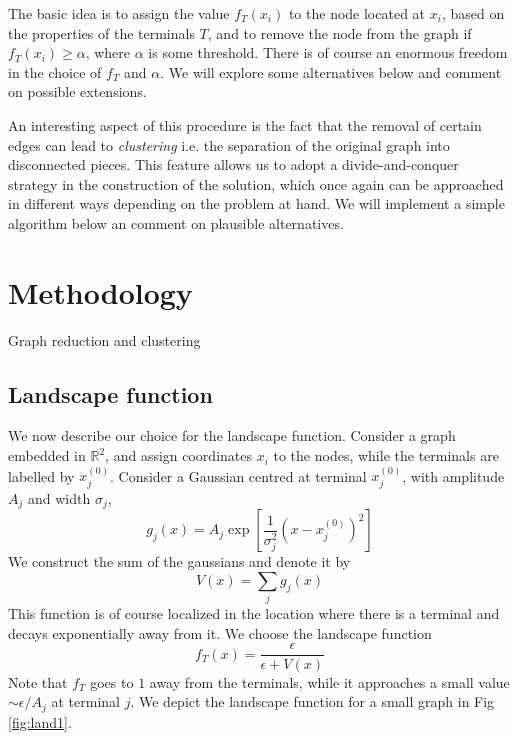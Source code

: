 \documentclass[12pt]{article}
\begin{document}
The basic idea is to assign the value $f_T(x_i)$ to the node located at $x_i$, based on the properties of the terminals $T$, 
and to remove the node from the graph if $f_T(x_i) \geq \alpha$, where $\alpha$ is some threshold.  
%
There is of course an enormous freedom in the choice of  $f_T$ and $\alpha$. We will explore some alternatives below and comment on possible extensions. 

An interesting aspect of this procedure is the fact that the removal of certain edges can lead to {\it clustering} i.e. the separation of the original graph into disconnected pieces. 
%
This feature allows us to adopt a divide-and-conquer strategy in the construction of the solution, which once again can be approached in different ways depending on the problem at hand. We will implement a simple algorithm below an comment on plausible alternatives. 


\section{Methodology}

Graph reduction and clustering

\subsection{Landscape function}

We now describe our choice for the landscape function. Consider a graph embedded in $\mathbb{R}^2$, and assign coordinates $x_i$ to the nodes, while the terminals are labelled by $x^{(0)}_j$. Consider a Gaussian centred at terminal $x^{(0)}_j$, with amplitude $A_j$ and width 
$\sigma_j$, 
%
\begin{equation}
	g_j(x) = A_j \exp\left[ \frac{1}{\sigma_j^2}(x -  x^{(0)}_j)^2 \right]
\end{equation}
%
We construct the sum of the gaussians and denote it by 
%
\begin{equation}
	V(x) = \sum_j g_j(x)
\end{equation}
%
This function is of course localized in the location where there is a terminal and decays exponentially away from it. 
We choose the landscape function 
%
\begin{equation}
	f_T(x) = \frac{\epsilon}{\epsilon + V(x)}
\end{equation}
%
Note that $f_T$ goes to $1$ away from the terminals, while it approaches a small value $\sim \epsilon/A_j$ at terminal $j$. 
We depict the landscape function for a small graph in Fig \ref{fig:land1}. 
\end{document}

